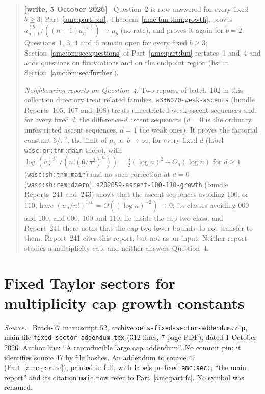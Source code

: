 \documentclass[11pt,letterpaper]{article}
\theoremstyle{remark}\newtheorem{remark}[theorem]{Remark}
\newenvironment{writenotedated}[1]{\par\smallskip\begin{quote}\small\textbf{[write, #1]}\ }{\end{quote}\smallskip}
\newenvironment{partsource}{\par\medskip\noindent\begin{minipage}{\linewidth}\small\raggedright\textit{Source.}\ }{\end{minipage}\par\medskip}
\newcommand{\repopath}[1]{\nolinkurl{#1}}
\begin{document}
\begin{writenotedated}{5 October 2026}
Question~2 is now answered for every fixed $b\ge3$: Part~\ref{amc:part:bm}, Theorem~\ref{amc:bm:thm:growth}, proves $a_{n+1}^{(b)}/((n+1)a_n^{(b)})\to\mu_b$ (no rate), and proves it again for $b=2$. Questions~1, 3, 4 and~6 remain open for every fixed $b\ge3$; Section~\ref{amc:bm:sec:questions} of Part~\ref{amc:part:bm} restates~1 and~4 and adds questions on fluctuations and on the endpoint region (list in Section~\ref{amc:bm:sec:further}).

\emph{Neighbouring reports on Question~4.} Two reports of batch~102 in this collection directory treat related families. \repopath{a336070-weak-ascents} (bundle Reports~105, 107 and~108) treats unrestricted weak ascent sequences and, for every fixed $d$, the difference-$d$ ascent sequences ($d=0$ is the ordinary unrestricted ascent sequences, $d=1$ the weak ones). It proves the factorial constant $6/\pi^2$, the limit of $\mu_b$ as $b\to\infty$, for every fixed $d$ (label \texttt{wasc:gr:thm:main} there), with $\log(a^{(d)}_n/(n!(6/\pi^2)^n))=\frac d2(\log n)^2+O_d(\log n)$ for $d\ge1$ (\texttt{wasc:sh:thm:main}) and no such correction at $d=0$ (\texttt{wasc:sh:rem:dzero}). \repopath{a202059-ascent-100-110-growth} (bundle Reports~241 and~243) shows that the ascent sequences avoiding $100$, or $110$, have $(u_n/n!)^{1/n}=\Theta((\log n)^{-2})\to0$; its classes avoiding $000$ and $100$, and $000$, $100$ and $110$, lie inside the cap-two class, and Report~241 there notes that the cap-two lower bounds do not transfer to them. Report~241 cites this report, but not as an input. Neither report studies a multiplicity cap, and neither answers Question~4.
\end{writenotedated}


\part{Fixed Taylor sectors for multiplicity cap growth constants}\label{amc:part:sec}

\begin{partsource}
Batch-77 manuscript 52, archive \texttt{oeis-fixed-sector-addendum.zip}, main file \texttt{fixed-sector-addendum.tex} (312 lines, 7-page PDF), dated 1 October 2026. Author line: ``A reproducible large cap addendum''. No commit pin; it identifies source 47 by file hashes. An addendum to source 47 (Part~\ref{amc:part:fc}), printed in full, with labels prefixed \texttt{amc:sec:}; ``the main report'' and its citation \texttt{main} now refer to Part~\ref{amc:part:fc}. No symbol was renamed.
\end{partsource}
\end{document}
